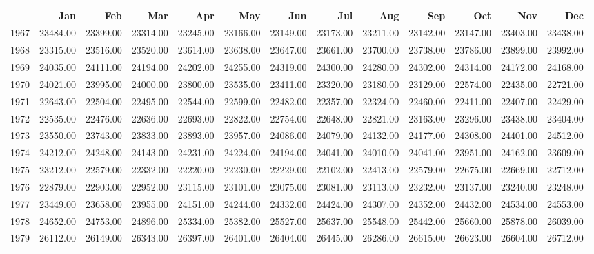 \begin{longtable}{rrrrrrrrrrrrr}
  \hline
 & Jan & Feb & Mar & Apr & May & Jun & Jul & Aug & Sep & Oct & Nov & Dec \\ 
  \hline
1967 & 23484.00 & 23399.00 & 23314.00 & 23245.00 & 23166.00 & 23149.00 & 23173.00 & 23211.00 & 23142.00 & 23147.00 & 23403.00 & 23438.00 \\ 
  1968 & 23315.00 & 23516.00 & 23520.00 & 23614.00 & 23638.00 & 23647.00 & 23661.00 & 23700.00 & 23738.00 & 23786.00 & 23899.00 & 23992.00 \\ 
  1969 & 24035.00 & 24111.00 & 24194.00 & 24202.00 & 24255.00 & 24319.00 & 24300.00 & 24280.00 & 24302.00 & 24314.00 & 24172.00 & 24168.00 \\ 
  1970 & 24021.00 & 23995.00 & 24000.00 & 23800.00 & 23535.00 & 23411.00 & 23320.00 & 23180.00 & 23129.00 & 22574.00 & 22435.00 & 22721.00 \\ 
  1971 & 22643.00 & 22504.00 & 22495.00 & 22544.00 & 22599.00 & 22482.00 & 22357.00 & 22324.00 & 22460.00 & 22411.00 & 22407.00 & 22429.00 \\ 
  1972 & 22535.00 & 22476.00 & 22636.00 & 22693.00 & 22822.00 & 22754.00 & 22648.00 & 22821.00 & 23163.00 & 23296.00 & 23438.00 & 23404.00 \\ 
  1973 & 23550.00 & 23743.00 & 23833.00 & 23893.00 & 23957.00 & 24086.00 & 24079.00 & 24132.00 & 24177.00 & 24308.00 & 24401.00 & 24512.00 \\ 
  1974 & 24212.00 & 24248.00 & 24143.00 & 24231.00 & 24224.00 & 24194.00 & 24041.00 & 24010.00 & 24041.00 & 23951.00 & 24162.00 & 23609.00 \\ 
  1975 & 23212.00 & 22579.00 & 22332.00 & 22220.00 & 22230.00 & 22229.00 & 22102.00 & 22413.00 & 22579.00 & 22675.00 & 22669.00 & 22712.00 \\ 
  1976 & 22879.00 & 22903.00 & 22952.00 & 23115.00 & 23101.00 & 23075.00 & 23081.00 & 23113.00 & 23232.00 & 23137.00 & 23240.00 & 23248.00 \\ 
  1977 & 23449.00 & 23658.00 & 23955.00 & 24151.00 & 24244.00 & 24332.00 & 24424.00 & 24307.00 & 24352.00 & 24432.00 & 24534.00 & 24553.00 \\ 
  1978 & 24652.00 & 24753.00 & 24896.00 & 25334.00 & 25382.00 & 25527.00 & 25637.00 & 25548.00 & 25442.00 & 25660.00 & 25878.00 & 26039.00 \\ 
  1979 & 26112.00 & 26149.00 & 26343.00 & 26397.00 & 26401.00 & 26404.00 & 26445.00 & 26286.00 & 26615.00 & 26623.00 & 26604.00 & 26712.00 \\ 

\end{longtable}
